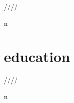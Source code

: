 \documentclass[]{fancy-cv}
\begin{document}
\vspace{-0.5em}
\begin{entrylist}
 \year/\degree/\school/\city/\subtitle in \positions {
  \entry{\year}{\degree}{\school}{\subtitle}
}
\end{entrylist}

\vspace{-2em}
\section{education}
\label{sec:education}

\vspace{-0.5em}
\begin{entrylist}
 \year/\degree/\school/\city/\subtitle in \education {
  \entry{\year}{\degree}{\school}{\subtitle}
}
\end{entrylist}

\clearpage
\end{document}
